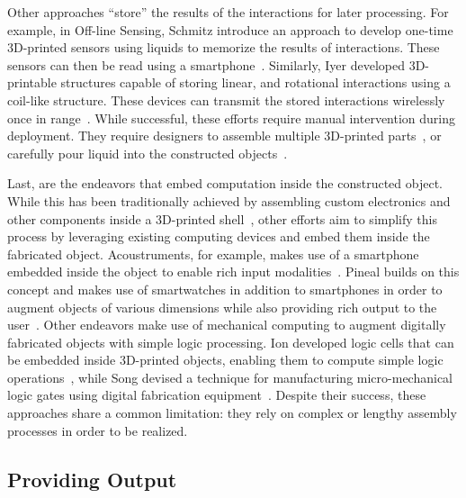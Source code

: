       Other approaches ``store'' the results of the interactions for
      later processing. For example, in Off-line Sensing, Schmitz \etal
      introduce an approach to develop one-time 3D-printed sensors using
      liquids to memorize the results of interactions. These sensors can
      then be read using a smartphone~\cite{Schmitz:2018}. Similarly,
      Iyer \etal developed 3D-printable structures capable of storing
      linear, and rotational interactions using a coil-like structure.
      These devices can transmit the stored interactions wirelessly once
      in range~\cite{Iyer:2018}. While successful, these efforts require
      manual intervention during deployment. They require designers to
      assemble multiple 3D-printed parts~\cite{Iyer:2018}, or carefully
      pour liquid into the constructed objects~\cite{Schmitz:2018}.

      Last, are the endeavors that embed computation inside the constructed
      object. While this has been traditionally achieved by assembling custom
      electronics and other components inside a 3D-printed
      shell~\cite{Murray-Smith:2008}, other efforts aim to simplify this process
      by leveraging existing computing devices and embed them inside the
      fabricated object. Acoustruments, for example, makes use of a smartphone
      embedded inside the object to enable rich input
      modalities~\cite{Laput:2015}. Pineal builds on this concept and makes use
      of smartwatches in addition to smartphones in order to augment objects of
      various dimensions while also providing rich output to the
      user~\cite{Ledo:2017}. Other endeavors make use of mechanical computing to
      augment digitally fabricated objects with simple logic processing. Ion
      \etal developed logic cells that can be embedded inside 3D-printed
      objects, enabling them to compute simple logic operations~\cite{Ion:2017},
      while Song \etal devised a technique for manufacturing micro-mechanical
      logic gates using digital fabrication equipment~\cite{Song:2019}. Despite
      their success, these approaches share a common limitation: they rely on
      complex or lengthy assembly processes in order to be realized.

    \subsection{Providing Output} \label{sec:output}

